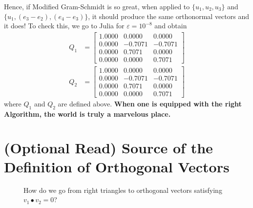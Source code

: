 \begin{tcolorbox}
Hence, if Modified Gram-Schmidt is so great, when applied to $\{u_1,u_2,u_3\}$ and $\{u_1,(e_3-e_2),(e_4-e_3)\}$, it should produce the same orthonormal vectors and it does! To check this, we go to Julia for $\varepsilon=10^{-8}$ and obtain
\begin{align*}
    Q_1 &= \left[ \begin{array}{rrr}
  1.0000     &    0.0000     &  0.0000  \\
    0.0000 &  -0.7071  & -0.7071 \\
        0.0000  &   0.7071   &      0.0000  \\
        0.0000   &      0.0000  &  0.7071
    \end{array} \right] \\
    Q_2&=\left[ \begin{array}{rrr}
  1.0000     &    0.0000     &  0.0000  \\
    0.0000 &  -0.7071  & -0.7071 \\
        0.0000  &   0.7071   &      0.0000  \\
        0.0000   &      0.0000  &  0.7071
    \end{array} \right]
    \end{align*}
where $Q_1$ and $Q_2$ are defined above. \textbf{When one is equipped with the right Algorithm, the world is truly a marvelous place.}
\end{tcolorbox}

\section{(Optional Read) Source of the Definition of Orthogonal Vectors}



\begin{figure}[htb]%
\centering
{}
\hspace{5pt}%
%
\caption[]{How do we go from right triangles to orthogonal vectors satisfying $v_1 \bullet v_2 = 0$?}
    \label{fig:RightTriangle}
\end{figure}

